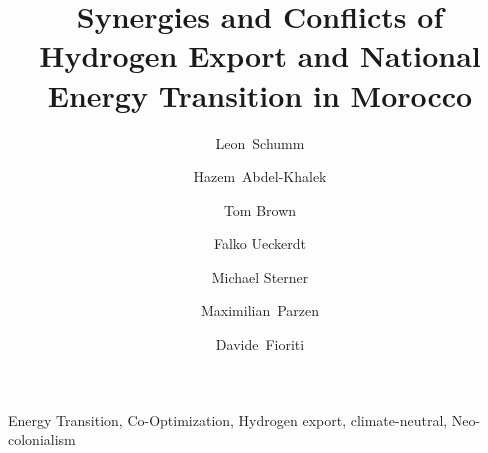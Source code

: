 \documentclass[5p]{elsarticle}
\begin{document}
\begin{frontmatter}

	\title{Synergies and Conflicts of Hydrogen Export and National Energy Transition in Morocco}
    
	\author[tub, oth]{Leon~Schumm}
	\author[ieg]{Hazem~Abdel-Khalek}
	\author[tub]{Tom Brown}
	\author[pik]{Falko Ueckerdt}
	\author[oth]{Michael Sterner}
	\author[uoe]{Maximilian~Parzen}
	\author[unipi]{Davide~Fioriti}


	\address[tub]{Department of Digital Transformation in Energy Systems, Institute of Energy Technology, Technische Universität Berlin, Fakultät III, Einsteinufer 25 (TA 8), 10587 Berlin, Germany}
	\address[oth]{Research Center on Energy Transmission and Storage (FENES), Faculty of Electrical and Information Technology, University of Applied Sciences (OTH) Regensburg, Seybothstrasse 2, 93053 Regensburg, Germany}
	\address[ieg]{Fraunhofer Research Institution for Energy Infrastructures and Geothermal Systems IEG, Cottbus, Germany}
	\address[pik]{Potsdam Institute for Climate Impact Research (PIK), Potsdam, Germany}
	\address[uoe]{University of Edinburgh, Institute for Energy Systems, EH9 3DW Edinburgh, United Kingdom}
	\address[unipi]{University of Pisa, Department of Energy, Systems, Territory and Construction Engineering, Largo Lucio Lazzarino, 56122 Pisa, Italy}

	\begin{abstract}
		
	\end{abstract}

	\begin{keyword}
		Energy Transition, Co-Optimization, Hydrogen export, climate-neutral, Neo-colonialism
	\end{keyword}



\end{frontmatter}
\end{document}
